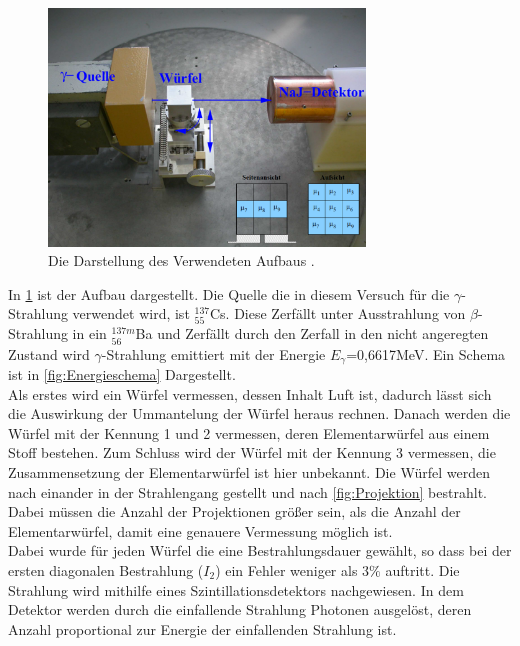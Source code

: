 \begin{figure}[h!]
\centering
\includegraphics[width = 0.75\textwidth]{../Grafiken/Aufbau.pdf}
\caption{Die Darstellung des Verwendeten Aufbaus \cite{V14}.}\label{fig:Aufbau}
\end{figure}
In \cref{fig:Aufbau} ist der Aufbau dargestellt.
Die Quelle die in diesem Versuch für die $\gamma$-Strahlung verwendet wird, ist ${}^{137}_{55}$Cs.
Diese Zerfällt unter Ausstrahlung von $\beta$-Strahlung in ein ${}^{137m}_{56}$Ba und Zerfällt durch den Zerfall in den nicht angeregten Zustand wird $\gamma$-Strahlung emittiert mit der Energie $E_\gamma$=0,6617MeV. Ein Schema ist in \cref{fig:Energieschema} Dargestellt.\\
Als erstes wird ein Würfel vermessen, dessen Inhalt Luft ist, dadurch lässt sich die Auswirkung der Ummantelung der Würfel heraus rechnen.
Danach werden die Würfel mit der Kennung 1 und 2 vermessen, deren Elementarwürfel aus einem Stoff bestehen.
Zum Schluss wird der Würfel mit der Kennung 3 vermessen, die Zusammensetzung der Elementarwürfel ist hier unbekannt. 
Die Würfel werden nach einander in der Strahlengang gestellt und nach \cref{fig:Projektion} bestrahlt.
Dabei müssen die Anzahl der Projektionen größer sein, als die Anzahl der Elementarwürfel, damit eine genauere Vermessung möglich ist.\\
Dabei wurde für jeden Würfel die eine Bestrahlungsdauer gewählt, so dass bei der ersten diagonalen Bestrahlung ($I_2$) ein Fehler weniger als $3\%$ auftritt.
Die Strahlung wird mithilfe eines Szintillationsdetektors nachgewiesen.
In dem Detektor werden durch die einfallende Strahlung Photonen ausgelöst, deren Anzahl proportional zur Energie der einfallenden Strahlung ist.
